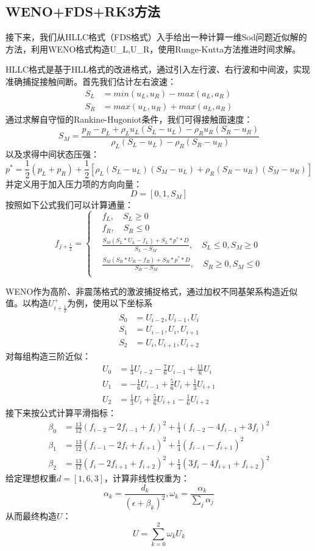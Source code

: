\documentclass[12pt,a4paper]{article}%
\begin{document}
		\subsection{WENO+FDS+RK3方法}
		接下来，我们从HLLC格式（FDS格式）入手给出一种计算一维Sod问题近似解的方法，利用WENO格式构造U\_L,U\_R，使用Runge-Kutta方法推进时间求解。
		
		HLLC格式是基于HLL格式的改进格式，通过引入左行波、右行波和中间波，实现准确捕捉接触间断。首先我们估计左右波速：
		\[
		\begin{aligned}
			S_L &= min(u_L,u_R) - max(a_L,a_R) \\
			S_R &= max(u_L,u_R) + max(a_L,a_R)
		\end{aligned}
		\]
		通过求解自守恒的Rankine-Hugoniot条件，我们可得接触面速度：
		\[
			S_M = \frac{p_R - p_L + \rho_L u_L(S_L - u_L) - \rho_R u_R(S_R - u_R)}{\rho_L(S_L - u_L) - \rho_R(S_R - u_R)}
		\]
		以及求得中间状态压强：
		\[
			p^* = \frac12 (p_L+p_R)+\frac12[\rho_L(S_L-u_L)(S_M-u_L)+\rho_R(S_R-u_R)(S_M-u_R)]
		\]
		并定义用于加入压力项的方向向量：
		\[
			D = [0,1,S_M]
		\]
		按照如下公式我们可以计算通量：
		\[
			f_{j+\frac12} = 
			\left\{
				\begin{aligned}
					& f_L, \quad S_L \geq 0 \\
					& f_R, \quad S_R \leq 0 \\
					& \frac{S_M(S_L*U_L-f_L)+S_L*p^**D}{S_L - S_M}, \quad S_L\leq0,S_M\geq0 \\
					& \frac{S_M(S_R*U_R-f_R)+S_R*p^**D}{S_R - S_M}, \quad S_R\geq0,S_M\leq0 \\
				\end{aligned}
			\right.
		\]
		
		WENO作为高阶、非震荡格式的激波捕捉格式，通过加权不同基架系构造近似值。以构造$U_{i+\frac12}^+$为例，使用以下坐标系
		\[
			\begin{aligned}
				S_0 &= {U_{i-2},U_{i-1},U_{i}} \\
				S_1 &= {U_{i-1},U_i,U_{i+1}} \\
				S_2 &= {U_{i},U_{i+1},U_{i+2}}
			\end{aligned}
		\]
		对每组构造三阶近似：
		\[
			\begin{aligned}
				U_0 &= \frac13 U_{i-2} - \frac76 U_{i-1} + \frac{11}{6} U_{i} \\
				U_1 &= -\frac16 U_{i-1} + \frac56 U_{i} + \frac13 U_{i+1} \\
				U_2 &= \frac13 U_{i} + \frac56 U_{i+1} -\frac16 U_{i+2}
			\end{aligned}
		\]
		接下来按公式计算平滑指标：
		\[
			\begin{aligned}
				\beta_0 &= \frac{13}{12}(f_{i-2} - 2f_{i-1} + f_i)^2 + \frac{1}{4}(f_{i-2} - 4f_{i-1} + 3f_i)^2 \\
				\beta_1 &= \frac{13}{12}(f_{i-1} - 2f_i + f_{i+1})^2 + \frac{1}{4}(f_{i-1} - f_{i+1})^2 \\
				\beta_2 &= \frac{13}{12}(f_i - 2f_{i+1} + f_{i+2})^2 + \frac{1}{4}(3f_i - 4f_{i+1} + f_{i+2})^2
			\end{aligned}
		\]
		给定理想权重$d=[1,6,3]$，计算非线性权重为：
		\[
			\alpha_k = \frac{d_k}{(\epsilon + \beta_k)^2},\omega_k = \frac{\alpha_k}{\sum_j\alpha_j}
		\]
		从而最终构造$U$：
		\[
			U = \sum_{k=0}^{2} \omega_k U_k
		\]
		
\end{document}
